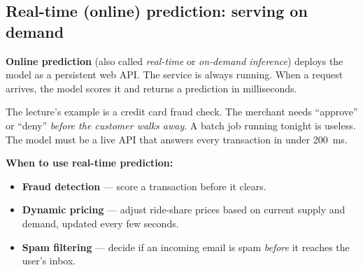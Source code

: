 \documentclass[a4paper,11pt]{article}
\newcommand{\vocab}[1]{\textbf{\color{navy}#1}}
\begin{document}
\subsection{Real-time (online) prediction: serving on demand}

\vocab{Online prediction} (also called \emph{real-time} or \emph{on-demand
inference}) deploys the model as a persistent web API. The service is always
running. When a request arrives, the model scores it and returns a prediction
in milliseconds.

The lecture's example is a credit card fraud check. The merchant needs
``approve'' or ``deny'' \emph{before the customer walks away}. A batch job
running tonight is useless. The model must be a live API that answers every
transaction in under 200~ms.

\textbf{When to use real-time prediction:}
\begin{itemize}
  \item \textbf{Fraud detection} --- score a transaction before it clears.
  \item \textbf{Dynamic pricing} --- adjust ride-share prices based on current
        supply and demand, updated every few seconds.
  \item \textbf{Spam filtering} --- decide if an incoming email is spam
        \emph{before} it reaches the user's inbox.
\end{itemize}
\end{document}
